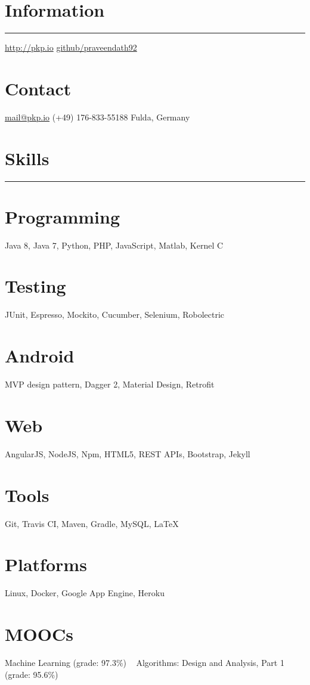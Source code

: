 \documentclass[]{friggeri-cv}
\begin{document}

\begin{aside}
    \section{Information}
        \noindent\rule{3cm}{0.5pt}
        \href{http://pkp.io}{http://pkp.io}
        \href{https://github.com/praveendath92}{github/praveendath92}
    \section{Contact}
        \href{mailto:mail@pkp.io}{mail@pkp.io}
        (+49) 176-833-55188
        Fulda, Germany
    ~
    \section{Skills}
        \noindent\rule{3cm}{0.5pt}
    \section{Programming}
        Java 8, Java 7, Python, PHP, JavaScript, Matlab, Kernel C
    \section{Testing}
        JUnit, Espresso, Mockito, Cucumber, Selenium, Robolectric
    \section{Android}
        MVP design pattern, Dagger 2, Material Design, Retrofit
    \section{Web}
        AngularJS, NodeJS, Npm, HTML5, REST APIs, Bootstrap, Jekyll
    \section{Tools}
        Git, Travis CI, Maven, Gradle, MySQL, \LaTeX
    \section{Platforms}
        Linux, Docker, Google App Engine, Heroku
    \section{MOOCs}
        Machine Learning (grade: 97.3\%)
        ~
        Algorithms: Design and Analysis, Part 1 (grade: 95.6\%)
\end{aside}
~
\end{document}
